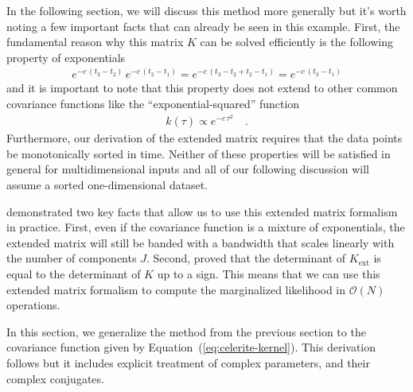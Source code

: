 \documentclass[manuscript, letterpaper]{aastex6}
\makeatletter
\let\origsubsection\subsection
\renewcommand\subsection{\@ifstar{\starsubsection}{\nostarsubsection}}
\newcommand\nostarsubsection[1]{\subsectionprelude\origsubsection{#1}}
\newcommand\starsubsection[1]{\subsectionprelude\origsubsection*{#1}}
\newcommand\subsectionprelude{\vspace{1em}}
\renewcommand{\eqref}[1]{\ref{eq:#1}}
\newcommand{\Eq}[1]{Equation~(\eqref{#1})}
\newcommand{\eq}[1]{\Eq{#1}}
\makeatother
\begin{document}
In the following section, we will discuss this method more generally but it's
worth noting a few important facts that can already be seen in this example.
First, the fundamental reason why this matrix $K$ can be solved efficiently is
the following property of exponentials
\begin{eqnarray}
    e^{-c\,(t_3 - t_2)} \, e^{-c\,(t_2 - t_1)} =
    e^{-c\,(t_3 - t_2 + t_2 - t_1)} =
    e^{-c\,(t_3 - t_1)}
\end{eqnarray}
and it is important to note that this property does not extend to other common
covariance functions like the ``exponential-squared'' function
\begin{eqnarray}
    k(\tau) \propto e^{-c\,\tau^2} \quad.
\end{eqnarray}
Furthermore, our derivation of the extended matrix requires that the data
points be monotonically sorted in time.
Neither of these properties will be satisfied in general for multidimensional
inputs and all of our following discussion will assume a sorted
one-dimensional dataset.

\citet{Ambikasaran:2015} demonstrated two key facts that allow us to use this
extended matrix formalism in practice.
First, even if the covariance function is a mixture of exponentials, the
extended matrix will still be banded with a bandwidth that scales linearly
with the number of components $J$.
Second, \citet{Ambikasaran:2015} proved that the determinant of
$K_\mathrm{ext}$ is equal to the determinant of $K$ up to a sign.
This means that we can use this extended matrix formalism to compute the
marginalized likelihood in $\mathcal{O}(N)$ operations.

\subsection{The algorithm}

In this section, we generalize the method from the previous section to the
covariance function given by \eq{celerite-kernel}.
This derivation follows \citet{Ambikasaran:2015} but it includes explicit
treatment of complex parameters, and their complex conjugates.
\end{document}
